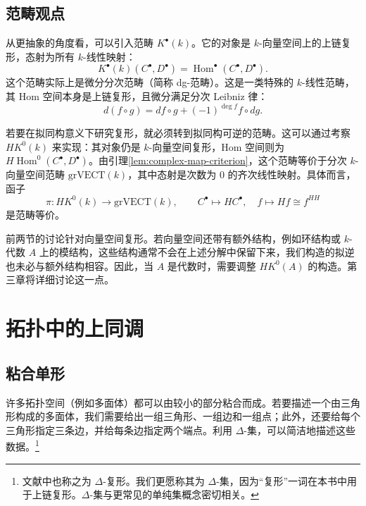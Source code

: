 \subsection{范畴观点}\label{subsec:complex-category}
从更抽象的角度看，可以引入范畴 $K^\bullet(k)$。它的对象是 $k$-向量空间上的上链复形，态射为所有 $k$-线性映射：
\[
  K^\bullet(k)(C^\bullet,D^\bullet)
  =\operatorname{Hom}^\bullet(C^\bullet,D^\bullet).
\]
这个范畴实际上是微分分次范畴（简称 dg-范畴）。这是一类特殊的 $k$-线性范畴，其 Hom 空间本身是上链复形，且微分满足分次 Leibniz 律：
\[
  d(f\circ g)=df\circ g+(-1)^{\deg f}f\circ dg.
\]

若要在拟同构意义下研究复形，就必须转到拟同构可逆的范畴。这可以通过考察 $HK^0(k)$ 来实现：其对象仍是 $k$-向量空间复形，Hom 空间则为 $H\operatorname{Hom}^0(C^\bullet,D^\bullet)$。由引理\ref{lem:complex-map-criterion}，这个范畴等价于分次 $k$-向量空间范畴 $\mathrm{grVECT}(k)$，其中态射是次数为 $0$ 的齐次线性映射。具体而言，函子
\[
  \pi\colon HK^0(k)\longrightarrow\mathrm{grVECT}(k),\qquad
  C^\bullet\longmapsto HC^\bullet,\quad
  f\longmapsto Hf\cong f^{HH}
\]
是范畴等价。

\begin{note}
前两节的讨论针对向量空间复形。若向量空间还带有额外结构，例如环结构或 $k$-代数 $A$ 上的模结构，这些结构通常不会在上述分解中保留下来，我们构造的拟逆也未必与额外结构相容。因此，当 $A$ 是代数时，需要调整 $HK^0(A)$ 的构造。第三章将详细讨论这一点。
\end{note}

\section{拓扑中的上同调}\label{sec:topology-cohomology}
\subsection{粘合单形}\label{subsec:gluing-simplices}
许多拓扑空间（例如多面体）都可以由较小的部分粘合而成。若要描述一个由三角形构成的多面体，我们需要给出一组三角形、一组边和一组点；此外，还要给每个三角形指定三条边，并给每条边指定两个端点。利用 $\Delta$-集，可以简洁地描述这些数据。\footnote{文献中也称之为 $\Delta$-复形。我们更愿称其为 $\Delta$-集，因为“复形”一词在本书中用于上链复形。$\Delta$-集与更常见的单纯集概念密切相关。}

